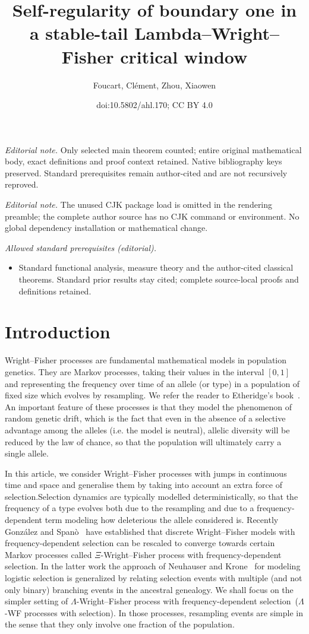\documentclass[10pt]{amsart}
\title{Self-regularity of boundary one in a stable-tail Lambda--Wright--Fisher critical window}
\author{Foucart, Clément, Zhou, Xiaowen}
\date{doi:10.5802/ahl.170; CC BY 4.0}
\theoremstyle{definition}\newtheorem{defi}[theo]{Definition}\newtheorem{rema}[theo]{Remark}\newtheorem{exam}[theo]{Example}\newtheorem{exem}[theo]{Example}\newtheorem{nota}[theo]{Notation}
\begin{document}
\maketitle
\noindent\textit{Editorial note.} Only selected main theorem counted; entire original mathematical body, exact definitions and proof context retained. Native bibliography keys preserved. Standard prerequisites remain author-cited and are not recursively reproved.\par\medskip
\noindent\textit{Editorial note.} The unused CJK package load is omitted in the rendering preamble; the complete author source has no CJK command or environment. No global dependency installation or mathematical change.\par\medskip
\noindent\textit{Allowed standard prerequisites (editorial).}\begin{itemize}
\item Standard functional analysis, measure theory and the author-cited classical theorems. Standard prior results stay cited; complete source-local proofs and definitions retained.
\end{itemize}\medskip
\section{Introduction}
Wright--Fisher processes are fundamental mathematical models in population genetics. They are Markov processes, taking their values in the interval $[0,1]$ and representing the frequency over time of an allele (or type) in a population of fixed size which evolves by resampling. We refer the reader to Etheridge's book~\cite{etheridge2011}. An important feature of these processes is that they model the phenomenon of random genetic drift, which is the fact that even in the absence of a selective advantage among the alleles (i.e. the model is neutral), allelic diversity will be reduced by the law of chance, so that the population will ultimately carry a single allele.

In this article, we consider Wright--Fisher processes with jumps in continuous time and space and generalise them by taking into account an extra force of selection.\linebreak Selection dynamics are typically modelled deterministically, so that the frequency of a type evolves both due to the resampling and due to a frequency-dependent term modeling how deleterious the allele considered is. Recently González and Spanò~\cite{zbMATH06873684} have established that discrete Wright--Fisher models with frequency-dependent selection can be rescaled to converge towards certain Markov processes called $\Xi$-Wright--Fisher process with frequency-dependent selection. In the latter work the approach of Neuhauser and Krone~\cite{zbMATH01078990} for modeling logistic selection is generalized by relating selection events with multiple (and not only binary) branching events in the ancestral genealogy. We shall focus on the simpler setting of $\Lambda$-Wright--Fisher process with frequency-dependent selection~($\Lambda$-WF processes with selection). In those processes, resampling events are simple in the sense that they only involve one fraction of the population.
\end{document}
